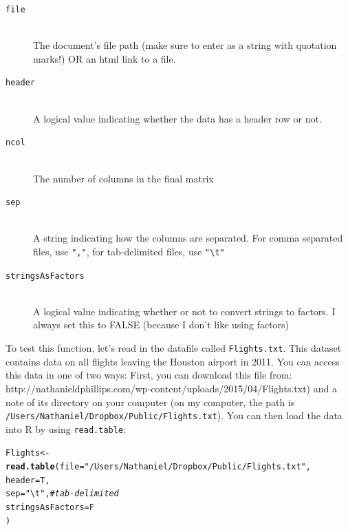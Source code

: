 \documentclass{tufte-book}\usepackage[]{graphicx}\usepackage[]{color}
\makeatletter
\newcommand{\hlstr}[1]{\textcolor[rgb]{0.192,0.494,0.8}{#1}}%
\newcommand{\hlcom}[1]{\textcolor[rgb]{0.678,0.584,0.686}{\textit{#1}}}%
\newcommand{\hlstd}[1]{\textcolor[rgb]{0.345,0.345,0.345}{#1}}%
\newcommand{\hlkwb}[1]{\textcolor[rgb]{0.69,0.353,0.396}{#1}}%
\newcommand{\hlkwc}[1]{\textcolor[rgb]{0.333,0.667,0.333}{#1}}%
\newcommand{\hlkwd}[1]{\textcolor[rgb]{0.737,0.353,0.396}{\textbf{#1}}}%
\newenvironment{kframe}{%
 \def\at@end@of@kframe{}%
 \ifinner\ifhmode%
  \def\at@end@of@kframe{\end{minipage}}%
  \begin{minipage}{\columnwidth}%
 \fi\fi%
 \def\FrameCommand##1{\hskip\@totalleftmargin \hskip-\fboxsep
 \colorbox{shadecolor}{##1}\hskip-\fboxsep
     \hskip-\linewidth \hskip-\@totalleftmargin \hskip\columnwidth}%
 \MakeFramed {\advance\hsize-\width
   \@totalleftmargin\z@ \linewidth\hsize
   \@setminipage}}%
 {\par\unskip\endMakeFramed%
 \at@end@of@kframe}
\newenvironment{knitrout}{}{} %
\makeatother
\begin{document}
\begin{footnotesize}
{{\begin{description}
  \item[\tt{file}] \hfill \\
      The document's file path (make sure to enter as a string with quotation marks!) OR an html link to a file.
        \item[\tt{header}] \hfill \\
      A logical value indicating whether the data has a header row or not.
        \item[\tt{ncol}] \hfill \\
      The number of columns in the final matrix
        \item[\tt{sep}] \hfill \\
      A string indicating how the columns are separated. For comma separated files, use \texttt{","}, for tab-delimited files, use \texttt{"\textbackslash t"}
      \item[\tt{stringsAsFactors}] \hfill \\
     A logical value indicating whether or not to convert strings to factors. I always set this to FALSE (because I don't like using factors)
\end{description}

}
}
\vspace{5mm} %


To test this function, let's read in the datafile called \texttt{Flights.txt}. This dataset contains data on all flights leaving the Houston airport in 2011. You can access this data in one of two ways: First, you can download this file from: http://nathanieldphillips.com/wp-content/uploads/2015/04/Flights.txt) and a note of its directory on your computer (on my computer, the path is \texttt{/Users/Nathaniel/Dropbox/Public/Flights.txt}). You can then load the data into R by using \texttt{read.table}:

\begin{footnotesize}
\begin{knitrout}
\color{fgcolor}\begin{kframe}
\begin{alltt}
\hlstd{Flights} \hlkwb{<-} \hlkwd{read.table}\hlstd{(}\hlkwc{file} \hlstd{=} \hlstr{"/Users/Nathaniel/Dropbox/Public/Flights.txt"}\hlstd{,}
                      \hlkwc{header} \hlstd{= T,}
                      \hlkwc{sep} \hlstd{=} \hlstr{"\textbackslash{}t"}\hlstd{,} \hlcom{# tab-delimited}
                      \hlkwc{stringsAsFactors} \hlstd{= F}
                      \hlstd{)}
\end{alltt}
\end{kframe}
\end{knitrout}
\end{footnotesize}


\end{footnotesize}
\end{document}
